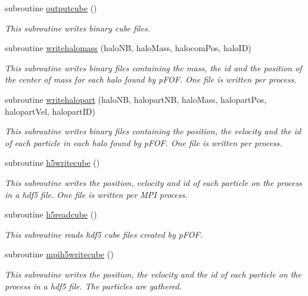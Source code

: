 \begin{DoxyCompactItemize}
subroutine \hyperlink{classmodio_a663de68512ba066cd881ea37f378f6a8}{outputcube} ()
\begin{DoxyCompactList}\small\item\em This subroutine writes binary cube files. \end{DoxyCompactList}\item 
subroutine \hyperlink{classmodio_a943b18e88497f616e47f7be2047d269a}{writehalomass} (halo\-N\-B, halo\-Mass, halocom\-Pos, halo\-I\-D)
\begin{DoxyCompactList}\small\item\em This subroutine writes binary files containing the mass, the id and the position of the center of mass for each halo found by p\-F\-O\-F. One file is written per process. \end{DoxyCompactList}\item 
subroutine \hyperlink{classmodio_ae7caa5bd1a32540628e11748a56626ae}{writehalopart} (halo\-N\-B, halopart\-N\-B, halo\-Mass, halopart\-Pos, halopart\-Vel, halopart\-I\-D)
\begin{DoxyCompactList}\small\item\em This subroutine writes binary files containing the position, the velocity and the id of each particle in each halo found by p\-F\-O\-F. One file is written per process. \end{DoxyCompactList}\item 
subroutine \hyperlink{classmodio_a52cdc31734affd194230ed16510dae68}{h5writecube} ()
\begin{DoxyCompactList}\small\item\em This subroutine writes the position, velocity and id of each particle on the process in a hdf5 file. One file is written per M\-P\-I process. \end{DoxyCompactList}\item 
subroutine \hyperlink{classmodio_a92f73643cbd1d8b16e0c29d683a147e0}{h5readcube} ()
\begin{DoxyCompactList}\small\item\em This subroutine reads hdf5 cube files created by p\-F\-O\-F. \end{DoxyCompactList}\item 
subroutine \hyperlink{classmodio_af1c4604ad1d5c38063a516fe6ef6756d}{mpih5writecube} ()
\begin{DoxyCompactList}\small\item\em This subroutine writes the position, the velocity and the id of each particle on the process in a hdf5 file. The particles are gathered. \end{DoxyCompactList}\item 

\end{DoxyCompactItemize}
